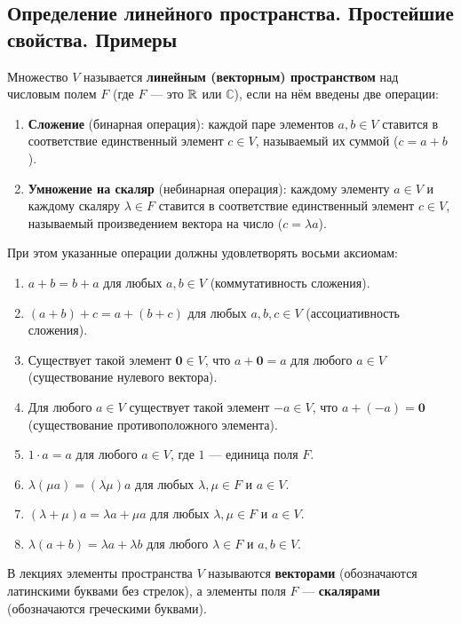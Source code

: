 \subsection{Определение линейного пространства. Простейшие свойства. Примеры}

\begin{definition}
Множество $V$ называется \textbf{линейным (векторным) пространством} над числовым полем $F$ (где $F$ — это $\mathbb{R}$ или $\mathbb{C}$), если на нём введены две операции:
\begin{enumerate}
    \item \textbf{Сложение} (бинарная операция): каждой паре элементов $a, b \in V$ ставится в соответствие единственный элемент $c \in V$, называемый их суммой ($c = a + b$).
    \item \textbf{Умножение на скаляр} (небинарная операция): каждому элементу $a \in V$ и каждому скаляру $\lambda \in F$ ставится в соответствие единственный элемент $c \in V$, называемый произведением вектора на число ($c = \lambda a$).
\end{enumerate}
При этом указанные операции должны удовлетворять восьми аксиомам:
\begin{enumerate}
    \item $a + b = b + a$ для любых $a, b \in V$ (коммутативность сложения).
    \item $(a + b) + c = a + (b + c)$ для любых $a, b, c \in V$ (ассоциативность сложения).
    \item Существует такой элемент $\mathbf{0} \in V$, что $a + \mathbf{0} = a$ для любого $a \in V$ (существование нулевого вектора).
    \item Для любого $a \in V$ существует такой элемент $-a \in V$, что $a + (-a) = \mathbf{0}$ (существование противоположного элемента).
    \item $1 \cdot a = a$ для любого $a \in V$, где $1$ — единица поля $F$.
    \item $\lambda(\mu a) = (\lambda\mu)a$ для любых $\lambda, \mu \in F$ и $a \in V$.
    \item $(\lambda + \mu)a = \lambda a + \mu a$ для любых $\lambda, \mu \in F$ и $a \in V$.
    \item $\lambda(a + b) = \lambda a + \lambda b$ для любого $\lambda \in F$ и $a, b \in V$.
\end{enumerate}
\end{definition}

В лекциях элементы пространства $V$ называются \textbf{векторами} (обозначаются латинскими буквами без стрелок), а элементы поля $F$ — \textbf{скалярами} (обозначаются греческими буквами).

